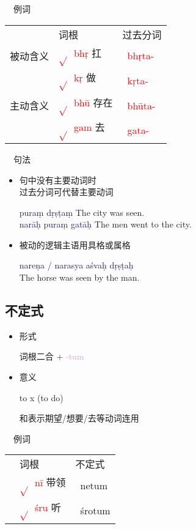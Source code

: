 \documentclass[17pt]{beamer}
\newcommand{\skt}[1]{{\sanskritfont{#1}}} %
\newcommand{\verbroot}[1]{\textcolor{red}{$\sqrt{}$#1}}
\newcommand{\sktroot}[1]{{\verbroot{\skt{#1}}}}
\newcommand{\skttransroot}[1]{{\sktroot{#1}~\textcolor{red}{#1}}}
\newcommand{\nounstem}[1]{\textcolor{red}{#1\nobreakdash-}}
\newcommand{\sktnounstem}[1]{{\textcolor{red}{\skt{#1\nobreakdash-}}}}
\newcommand{\skttransnounstem}[1]{{\sktnounstem{#1}~\nounstem{#1}}}
\newcommand{\fullpada}[1]{\textcolor{OliveGreen}{#1}}
\newcommand{\sktpada}[1]{{\textcolor{OliveGreen}{\skt{#1}}}}
\newcommand{\skttranspada}[1]{{\sktpada{#1}~\fullpada{#1}}}
\newcommand{\pratyaya}[1]{\textcolor{Plum}{#1}}
\newcommand{\fullsentence}[1]{\textcolor{MidnightBlue}{#1}}
\begin{document}
\begin{frame}{\insertsubsection ~~例词}
  \centering
  \begin{tabular}{@{}lll@{}} %
    & 词根 & 过去分词  \\
    被动含义 & \skttransroot{bhṛ} 扛 & \skttransnounstem{bhṛta}  \\
    & \skttransroot{kṛ} 做 & \skttransnounstem{kṛta}  \\
    主动含义 &  \skttransroot{bhū} 存在 & \skttransnounstem{bhūta} \\ 
    & \skttransroot{gam} 去 & \skttransnounstem{gata}\\
  \end{tabular}
\end{frame}

\begin{frame}{\insertsubsection ~~句法}
  \begin{itemize}
    \item 句中没有主要动词时\\过去分词可代替主要动词
    
    \fullsentence{puraṃ dṛṣṭaṃ} The city was seen. \\
    \fullsentence{narāḥ puraṃ gatāḥ} The men went to the city.
    \item 被动的逻辑主语用具格或属格
    
    \fullsentence{nareṇa / narasya aśvaḥ dṛṣṭaḥ} \\
    The horse was seen by the man.
  \end{itemize}
\end{frame}

\subsection{不定式}
\begin{frame}{\insertsubsection }
  \begin{itemize}
    \item 形式
    
    词根二合 + \pratyaya{\nobreakdash-tum} 

    \item 意义
    
    to x (to do)
    
    和表示期望/想要/去等动词连用
  \end{itemize}
\end{frame}

\begin{frame}{\insertsubsection ~~例词}
  \centering
  \begin{tabular}{@{}lll@{}} %
    & 词根 & 不定式  \\
    & \skttransroot{nī} 带领 & \skttranspada{netum}  \\
    & \skttransroot{śru} 听 & \skttranspada{śrotum}  \\ 
  \end{tabular}
\end{frame}
\end{document}
